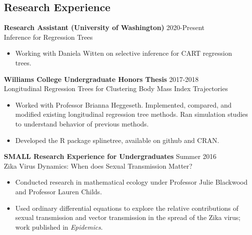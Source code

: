 \documentclass[margin, 10pt]{res} %
\begin{document}
\begin{resume}
 
\section{Research Experience}

{\textbf{Research Assistant (University of Washington)} \hfill 2020-Present  \\
Inference for Regression Trees
\begin{itemize}
\item Working with Daniela Witten on selective inference for CART regression trees. 
\end{itemize} 

{\textbf{Williams College Undergraduate Honors Thesis}} \hfill 2017-2018  \\
Longitudinal Regression Trees for Clustering Body Mass Index Trajectories
\begin{itemize}
\item Worked with Professor Brianna Heggeseth. Implemented, compared, and modified existing longitudinal regression tree methods. Ran simulation studies to understand behavior of previous methods.  \item Developed the R package splinetree, available on github and CRAN. 
\end{itemize} 

{\textbf{SMALL Research Experience for Undergraduates}} \hfill Summer 2016 \\
Zika Virus Dynamics: When does Sexual Transmission Matter? 
\begin{itemize}
\item Conducted research in mathematical ecology under Professor Julie Blackwood and Professor Lauren Childs. 
\item Used ordinary differential equations to explore the relative contributions of sexual transmission and vector transmission in the spread of the Zika virus; work published in \textit{Epidemics}.  
\end{itemize} 


}
\end{resume}
\end{document}
